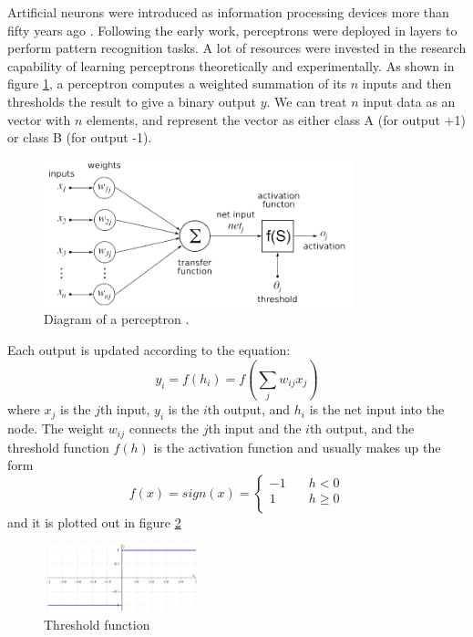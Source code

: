 Artificial neurons were introduced as information processing devices more than fifty years ago \citep{mcculloch1943logical}. Following the early work, perceptrons were deployed in layers to perform pattern recognition tasks. A lot of resources were invested in the research capability of learning perceptrons theoretically and experimentally. As shown in figure \ref{fig:perceptron}, a perceptron computes a weighted summation of its $n$ inputs and then thresholds the result to give a binary output $y$. We can treat $n$ input data as an vector with $n$ elements, and represent the vector as either class A (for output +1) or class B (for output -1).
\graphicspath{ {./Figures/} }
\begin{figure}[!htb]
\centering
\includegraphics[width=0.8\textwidth]{Figure2-1.png}
\caption{\label{fig:perceptron}Diagram of a perceptron \citep{NeuronFigure1}.}
\end{figure}

Each output is updated according to the equation:
\begin{equation}\label{eq:BasicEq}
y_{i} = f(h_{i}) = f\left(\sum_{j}w_{ij}x_{j}\right)
\end{equation}
where $x_{j}$ is the $j$th input, $y_{i}$ is the $i$th output, and $h_{i}$ is the net input into the node. The weight $w_{ij}$ connects the $j$th input and the $i$th output, and the threshold function $f(h)$ is the activation function and usually makes up the form
\begin{equation}\label{eq:FullEq}
f(x) = sign(x) = 
  \begin{cases}
    -1       & \quad h < 0 \\
    1  & \quad h \geq 0\\
  \end{cases}
\end{equation}
and it is plotted out in figure \ref{fig:ThresholdFunc}
\graphicspath{ {./Figures/} }
\begin{figure}[!htb]
\centering
\includegraphics[width=0.4\textwidth]{ThresholdFunc.jpeg}
\caption{\label{fig:ThresholdFunc}Threshold function}
\end{figure}

